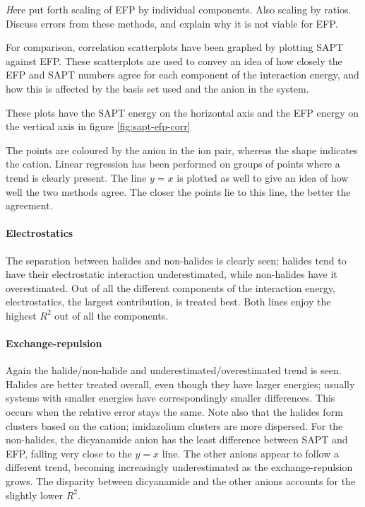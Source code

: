 
{\emph 
    Here put forth scaling of EFP by individual components.
    Also scaling by ratios.
    Discuss errors from these methods, and explain why it is not viable for EFP. 
}

For comparison, correlation scatterplots have been graphed by plotting SAPT against EFP.
These scatterplots are used to convey an idea of how closely the EFP and SAPT numbers agree for each component of the interaction energy, and how this is affected by the basis set used and the anion in the system.


These plots have the SAPT energy on the horizontal axis and the EFP energy on the vertical axis in figure 
\ref{fig:sapt-efp-corr}

The points are coloured by the anion in the ion pair, whereas the shape indicates the cation.
Linear regression has been performed on groups of points where a trend is clearly present.
The line $ y = x $ is plotted as well to give an idea of how well the two methods agree.
The closer the points lie to this line, the better the agreement. 

\paragraph{Electrostatics}
The separation between halides and non-halides is clearly seen; halides tend to have their electrostatic interaction underestimated, while non-halides have it overestimated. 
Out of all the different components of the interaction energy, electrostatics, the largest contribution, is treated best. 
Both lines enjoy the highest $R^2$ out of all the components.

\paragraph{Exchange-repulsion}
Again the halide/non-halide and underestimated/overestimated trend is seen. 
Halides are better treated overall, even though they have larger energies; usually systems with smaller energies have correspondingly smaller differences.
This occurs when the relative error stays the same.
Note also that the halides form clusters based on the cation; imidazolium clusters are  more dispersed.
For the non-halides, the dicyanamide anion has the least difference between SAPT and EFP, falling very close to the $y = x$ line.
The other anions appear to follow a different trend, becoming increasingly underestimated as the exchange-repulsion grows.
The disparity between dicyanamide and the other anions accounts for the slightly lower $R^2$.


